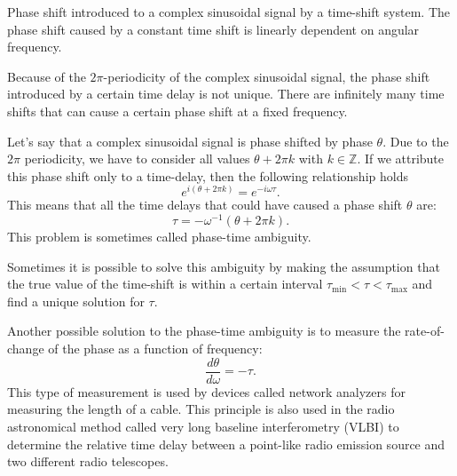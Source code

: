 \begin{marginfigure}
  \begin{center}
  \end{center}
  \caption{Phase shift introduced to a complex sinusoidal signal by a time-shift system. The phase shift caused by a constant time shift is linearly dependent on angular frequency.}
  \label{fig:timeshift_phase}
\end{marginfigure}

Because of the $2\pi$-periodicity of the complex sinusoidal signal,
the phase shift introduced by a certain time delay is not
unique. There are infinitely many time shifts that can cause a certain
phase shift at a fixed frequency.

Let's say that a complex sinusoidal signal is phase shifted by phase
$\theta$. Due to the $2\pi$ periodicity, we have to consider all
values $\theta + 2\pi k$ with $k\in\mathbb{Z}$. If we attribute this
phase shift only to a time-delay, then the following relationship holds
\begin{equation}
  e^{i (\theta+2\pi k)} = e^{-i \omega \tau}.
\end{equation}
This means that all the time delays that could have caused a phase shift $\theta$ are:
\begin{equation}
  \tau = -\omega^{-1}(\theta+2\pi k).
\end{equation}
This problem is sometimes called phase-time ambiguity.

Sometimes it is possible to solve this ambiguity by making the assumption that the true value
of the time-shift is within a certain interval $\tau_{\mathrm{min}} < \tau < \tau_{\mathrm{max}}$
and find a unique solution for $\tau$.

Another possible solution to the phase-time ambiguity is to measure the rate-of-change of the
phase as a function of frequency:
\begin{equation}
  \frac{d\theta}{d\omega} = -\tau.
\end{equation}
This type of measurement is used by devices called network analyzers for measuring the length of a cable.
This principle is also used in the radio astronomical method called very long baseline interferometry (VLBI)
to determine the relative time delay between a point-like radio emission source and two different radio telescopes.

